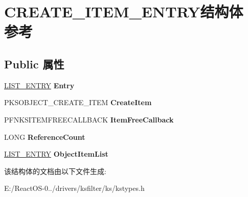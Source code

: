 \hypertarget{struct_c_r_e_a_t_e___i_t_e_m___e_n_t_r_y}{}\section{C\+R\+E\+A\+T\+E\+\_\+\+I\+T\+E\+M\+\_\+\+E\+N\+T\+R\+Y结构体 参考}
\label{struct_c_r_e_a_t_e___i_t_e_m___e_n_t_r_y}
\subsection*{Public 属性}
\begin{DoxyCompactItemize}
\item 
\mbox{\label{struct_c_r_e_a_t_e___i_t_e_m___e_n_t_r_y_a23d55a19d22788a3ffcc6d3fbd3921ad}} 
\hyperlink{struct___l_i_s_t___e_n_t_r_y}{L\+I\+S\+T\+\_\+\+E\+N\+T\+RY} {\bfseries Entry}
\item 
\mbox{\label{struct_c_r_e_a_t_e___i_t_e_m___e_n_t_r_y_a03069a483082c495fe655b04a4406c6f}} 
P\+K\+S\+O\+B\+J\+E\+C\+T\+\_\+\+C\+R\+E\+A\+T\+E\+\_\+\+I\+T\+EM {\bfseries Create\+Item}
\item 
\mbox{\label{struct_c_r_e_a_t_e___i_t_e_m___e_n_t_r_y_aa45ad58482f0fac2c8673de42dabe64a}} 
P\+F\+N\+K\+S\+I\+T\+E\+M\+F\+R\+E\+E\+C\+A\+L\+L\+B\+A\+CK {\bfseries Item\+Free\+Callback}
\item 
\mbox{\label{struct_c_r_e_a_t_e___i_t_e_m___e_n_t_r_y_a3d97bd80d934ec7f5e3df23415a50992}} 
L\+O\+NG {\bfseries Reference\+Count}
\item 
\mbox{\label{struct_c_r_e_a_t_e___i_t_e_m___e_n_t_r_y_a41a0f374199e7b82afc03f925caf2235}} 
\hyperlink{struct___l_i_s_t___e_n_t_r_y}{L\+I\+S\+T\+\_\+\+E\+N\+T\+RY} {\bfseries Object\+Item\+List}
\end{DoxyCompactItemize}


该结构体的文档由以下文件生成\+:\begin{DoxyCompactItemize}
\item 
E\+:/\+React\+O\+S-\/0../drivers/ksfilter/ks/kstypes.\+h\end{DoxyCompactItemize}
